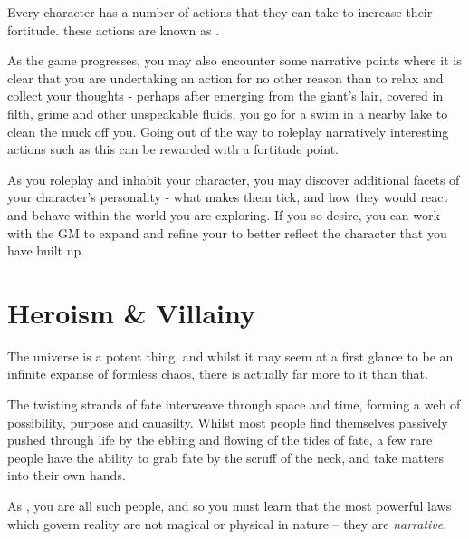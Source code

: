 Every character has a number of actions that they can take to increase their fortitude. these actions are known as .

\begin{itemize}
\end{itemize}

As the game progresses, you may also encounter some narrative points where it is clear that you are undertaking an action for no other reason than to relax and collect your thoughts - perhaps after emerging from the giant's lair, covered in filth, grime and other unspeakable fluids, you go for a swim in a nearby lake to clean the muck off you. Going out of the way to roleplay narratively interesting actions such as this can be rewarded with a fortitude point. 

As you roleplay and inhabit your character, you may discover additional facets of your character's personality - what makes them tick, and how they would react and behave within the world you are exploring. If you so desire, you can work with the GM to expand and refine your  to better reflect the character that you have built up. 


\section{Heroism \& Villainy}

The universe is a potent thing, and whilst it may seem at a first glance to be an infinite expanse of formless chaos, there is actually far more to it than that. 

The twisting strands of fate interweave through space and time, forming a web of possibility, purpose and cauasilty. Whilst most people find themselves passively pushed through life by the ebbing and flowing of the tides of fate, a few rare people have the ability to grab fate by the scruff of the neck, and take matters into their own hands. 

As , you are all such people, and so you must learn that the most powerful laws which govern reality are not magical or physical in nature -- they are {\it narrative}. 

